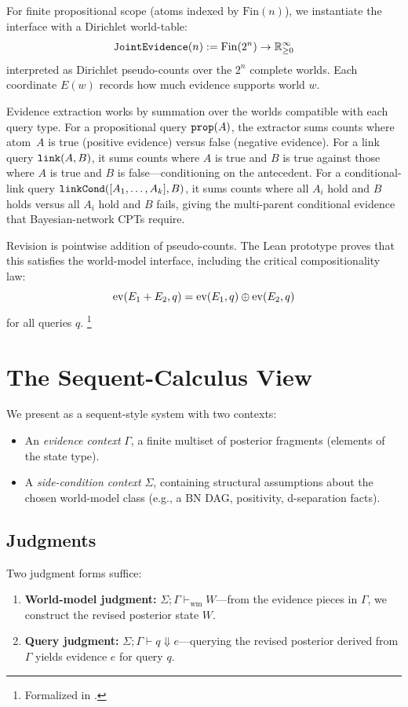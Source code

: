 \documentclass[11pt,openany]{report}
\begin{document}
For finite propositional scope (atoms indexed by $\mathrm{Fin}(n)$), we
instantiate the \WorldModel{} interface with a Dirichlet world-table:
\[
  \mathtt{JointEvidence}(n) := \mathrm{Fin}(2^n) \to \mathbb{R}_{\ge 0}^{\infty}
\]
interpreted as Dirichlet pseudo-counts over the $2^n$ complete worlds.
Each coordinate $E(w)$ records how much evidence supports world $w$.

Evidence extraction works by summation over the worlds compatible with
each query type.  For a propositional query $\texttt{prop}(A)$, the
extractor sums counts where atom~$A$ is true (positive evidence) versus
false (negative evidence).  For a link query $\texttt{link}(A, B)$, it sums
counts where $A$ is true and $B$ is true against those where $A$ is true
and $B$ is false---conditioning on the antecedent.  For a conditional-link
query $\texttt{linkCond}([A_1, \ldots, A_k], B)$, it sums counts where all
$A_i$ hold and $B$ holds versus all $A_i$ hold and $B$ fails, giving the
multi-parent conditional evidence that Bayesian-network CPTs require.

Revision is pointwise addition of pseudo-counts.  The Lean prototype proves
that this satisfies the world-model interface, including the critical
compositionality law:
\[
  \mathrm{ev}(E_1 + E_2, q) = \mathrm{ev}(E_1, q) \oplus \mathrm{ev}(E_2, q)
\]
for all queries $q$.%
\footnote{Formalized in .}

\section{The Sequent-Calculus View}

We present \xiPLN{} as a sequent-style system with two contexts:
\begin{itemize}
\item An \emph{evidence context} $\Gamma$, a finite multiset of posterior
  fragments (elements of the state type).
\item A \emph{side-condition context} $\Sigma$, containing structural
  assumptions about the chosen world-model class (e.g., a BN DAG,
  positivity, d-separation facts).
\end{itemize}

\subsection{Judgments}

Two judgment forms suffice:
\begin{enumerate}
\item \textbf{World-model judgment:}
  $\Sigma; \Gamma \vdash_{\mathrm{wm}} W$---from the evidence pieces in
  $\Gamma$, we construct the revised posterior state $W$.

\item \textbf{Query judgment:}
  $\Sigma; \Gamma \vdash q \Downarrow e$---querying the revised posterior
  derived from $\Gamma$ yields evidence $e$ for query $q$.
\end{enumerate}
\end{document}
